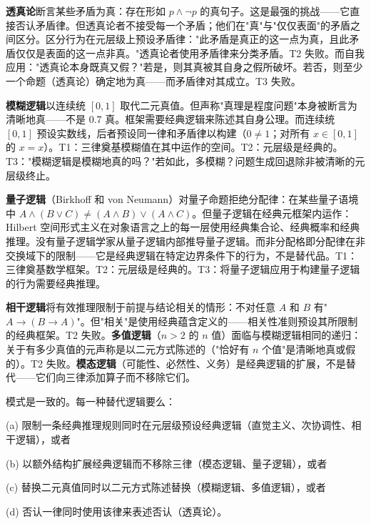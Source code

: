 \documentclass[10pt, openany, oneside]{book}
\begin{document}
\textbf{透真论}断言某些矛盾为真：存在形如 $p \wedge \neg p$ 的真句子。这是最强的挑战——它直接否认矛盾律。但透真论者不接受每一个矛盾；他们在"真"与"仅仅表面"的矛盾之间区分。区分行为在元层级上预设矛盾律："此矛盾是真正的这一点为真，且此矛盾仅仅是表面的这一点非真。"透真论者使用矛盾律来分类矛盾。T2 失败。而自我应用："透真论本身既真又假？"若是，则其真被其自身之假所破坏。若否，则至少一个命题（透真论）确定地为真——而矛盾律对其成立。T3 失败。

\textbf{模糊逻辑}以连续统 $[0, 1]$ 取代二元真值。但声称"真理是程度问题"本身被断言为清晰地真——不是 0.7 真。框架需要经典逻辑来陈述其自身公理。而连续统 $[0, 1]$ 预设实数线，后者预设同一律和矛盾律以构建（$0 \neq 1$；对所有 $x \in [0,1]$ 的 $x = x$）。T1：三律奠基模糊值在其中运作的空间。T2：元层级是经典的。T3："模糊逻辑是模糊地真的吗？"若如此，多模糊？问题生成回退除非被清晰的元层级终止。

\textbf{量子逻辑}（Birkhoff 和 von Neumann）对量子命题拒绝分配律：在某些量子语境中 $A \wedge (B \vee C) \neq (A \wedge B) \vee (A \wedge C)$。但量子逻辑在经典元框架内运作：Hilbert 空间形式主义在对象语言之上的每一层使用经典集合论、经典概率和经典推理。没有量子逻辑学家从量子逻辑内部推导量子逻辑。而非分配格即分配律在非交换域下的限制——它是经典逻辑在特定边界条件下的行为，不是替代品。T1：三律奠基数学框架。T2：元层级是经典的。T3：将量子逻辑应用于构建量子逻辑的行为需要经典推理。

\textbf{相干逻辑}将有效推理限制于前提与结论相关的情形：不对任意 $A$ 和 $B$ 有"$A \to (B \to A)$"。但"相关"是使用经典蕴含定义的——相关性准则预设其所限制的经典框架。T2 失败。\textbf{多值逻辑}（$n > 2$ 的 $n$ 值）面临与模糊逻辑相同的递归：关于有多少真值的元声称是以二元方式陈述的（"恰好有 $n$ 个值"是清晰地真或假的）。T2 失败。\textbf{模态逻辑}（可能性、必然性、义务）是经典逻辑的扩展，不是替代——它们向三律添加算子而不移除它们。

模式是一致的。每一种替代逻辑要么：

\vspace{0.3em}

\noindent (a) 限制一条经典推理规则同时在元层级预设经典逻辑（直觉主义、次协调性、相干逻辑），或者

\noindent (b) 以额外结构扩展经典逻辑而不移除三律（模态逻辑、量子逻辑），或者

\noindent (c) 替换二元真值同时以二元方式陈述替换（模糊逻辑、多值逻辑），或者

\noindent (d) 否认一律同时使用该律来表述否认（透真论）。

\vspace{0.3em}
\end{document}
